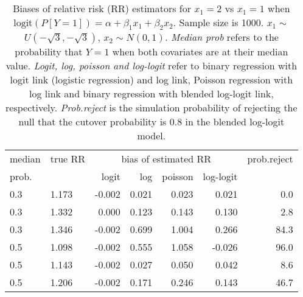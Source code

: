 \documentclass[12pt,a4paper]{article}
\begin{document}
\begin{table}[H] 
\small\sf\centering 
\caption{Biases of relative risk (RR) estimators for $x_1=2$ vs $x_1=1$ when $\mbox{logit}(P[Y=1])=\alpha+\beta_1 x_1 + \beta_2 x_2$. Sample size is 1000. $x_1 \sim $$U(-\sqrt{3},-\sqrt{3})$, $x_2 \sim N(0,1)$. {\it Median prob} refers to the probability that $Y=1$ when both covariates are at their median value. {\it Logit, log, poisson and log-logit} refer to binary regression with logit link (logistic regression) and log link, Poisson regression with log link and binary regression with blended log-logit link, respectively. {\it Prob.reject} is the simulation probability of rejecting the null that the cutover probability is $0.8$ in the blended log-logit model.} 
\begin{tabular}{llrrrrr} 
\toprule 
median & true RR & \multicolumn{4}{c}{bias of estimated RR} & prob.reject \\ 
prob. & & logit & log & poisson & log-logit  & \\ \midrule 
0.3 & 1.173 & -0.002 & 0.021 & 0.023 &  0.021 &  0.0 \\  
0.3 & 1.332 &  0.000 & 0.123 & 0.143 &  0.130 &  2.8 \\  
0.3 & 1.346 & -0.002 & 0.699 & 1.004 &  0.266 & 84.3 \\  
0.5 & 1.098 & -0.002 & 0.555 & 1.058 & -0.026 & 96.0 \\  
0.5 & 1.143 & -0.002 & 0.027 & 0.050 &  0.042 &  8.6 \\  
0.5 & 1.206 & -0.002 & 0.171 & 0.246 &  0.143 & 46.7 \\  
\bottomrule 
\end{tabular} 
\end{table} 
\end{document}
